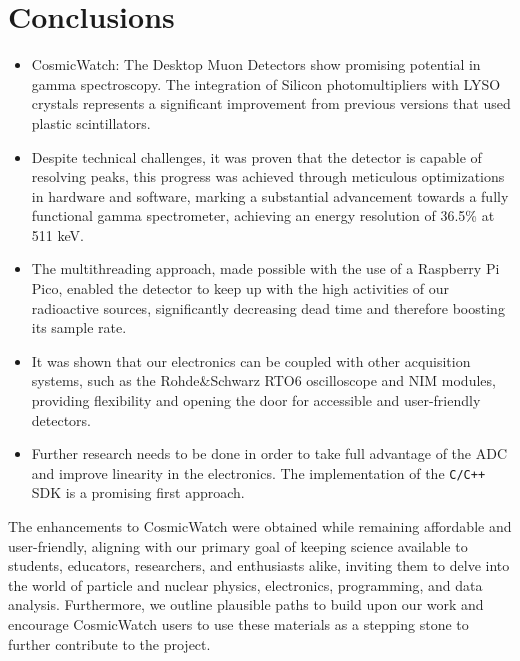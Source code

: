 \chapter{Conclusions}

\begin{itemize}
    \item CosmicWatch: The Desktop Muon Detectors show promising potential in gamma spectroscopy. The integration of Silicon photomultipliers with LYSO crystals represents a significant improvement from previous versions that used plastic scintillators.\item Despite technical challenges, it was proven that the detector is capable of resolving peaks, this progress was achieved through meticulous optimizations in hardware and software, marking a substantial advancement towards a fully functional gamma spectrometer, achieving an energy resolution of 36.5\% at 511 keV.
    \item The multithreading approach, made possible with the use of a Raspberry Pi Pico, enabled the detector to keep up with the high activities of our radioactive sources, significantly decreasing dead time and therefore boosting its sample rate.
    \item It was shown that our electronics can be coupled with other acquisition systems, such as the Rohde\&Schwarz RTO6 oscilloscope and NIM modules, providing flexibility and opening the door for accessible and user-friendly detectors.
    \item Further research needs to be done in order to take full advantage of the ADC and improve linearity in the electronics. The implementation of the \texttt{C/C++} SDK is a promising first approach.
\end{itemize}

The enhancements to CosmicWatch were obtained while remaining affordable and user-friendly, aligning with our primary goal of keeping science available to students, educators, researchers, and enthusiasts alike, inviting them to delve into the world of particle and nuclear physics, electronics, programming, and data analysis. Furthermore, we outline plausible paths to build upon our work and encourage CosmicWatch users to use these materials as a stepping stone to further contribute to the project.